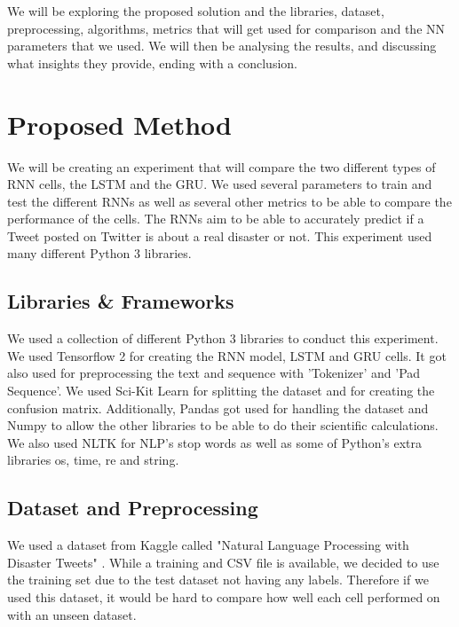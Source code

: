 \documentclass[a4paper,10pt]{article}
\begin{document}
	We will be exploring the proposed solution and the libraries, dataset, preprocessing, algorithms, metrics that will get used for comparison and the NN parameters that we used. We will then be analysing the results, and discussing what insights they provide, ending with a conclusion.


\section{Proposed Method}
	We will be creating an experiment that will compare the two different types of RNN cells, the LSTM and the GRU. We used several parameters to train and test the different RNNs as well as several other metrics to be able to compare the performance of the cells. The RNNs aim to be able to accurately predict if a Tweet posted on Twitter is about a real disaster or not. This experiment used many different Python 3 libraries.

\subsection{Libraries \& Frameworks}
	We used a collection of different Python 3 libraries to conduct this experiment. We used Tensorflow 2 \cite{tensorflow} for creating the RNN model, LSTM and GRU cells. It got also used for preprocessing the text and sequence with 'Tokenizer' and 'Pad Sequence'. We used Sci-Kit Learn \cite{scikit-learn} for splitting the dataset and for creating the confusion matrix. Additionally, Pandas \cite{} got used for handling the dataset and Numpy to allow the other libraries to be able to do their scientific calculations. We also used NLTK \cite{} for NLP's stop words as well as some of Python's extra libraries os, time, re and string. 

\subsection{Dataset and Preprocessing}
	We used a dataset from Kaggle called "Natural Language Processing with Disaster Tweets" \cite{disater_kaggle}. While a training and CSV file is available, we decided to use the training set due to the test dataset not having any labels. Therefore if we used this dataset, it would be hard to compare how well each cell performed on with an unseen dataset.
\end{document}
